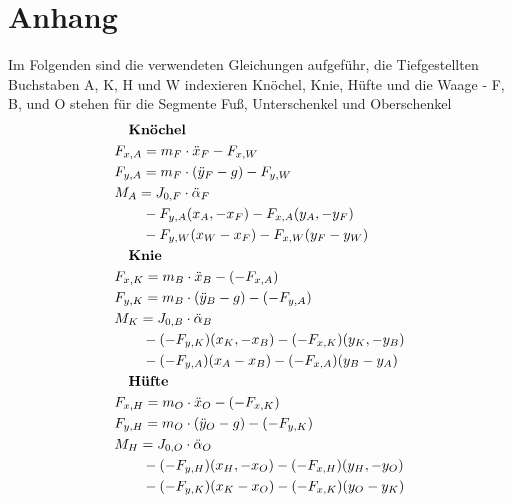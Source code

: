 \appendix                %

\setcounter{page}{1}
\section*{Anhang}%


Im Folgenden sind die verwendeten Gleichungen aufgeführ, die Tiefgestellten Buchstaben A, K, H und W indexieren Knöchel, Knie, Hüfte und die Waage -  F, B, und O stehen für die Segmente Fuß, Unterschenkel und Oberschenkel\\
\begin{align*}
& \quad \text{\textbf{Knöchel}}\\
& F_{x, A} =  m_F \cdot \ddot{x}_F - F_{x, W} \\
& F_{y, A} =  m_F \cdot (\ddot{y}_F - g) - F_{y, W} \\
& M_{A} =  J_{0, F} \cdot \ddot{\alpha}_F  \\
& \qquad - F_{y, A} (x_A, - x_F) - F_{x, A} (y_A, - y_F)\\
& \qquad - F_{y, W}(x_W - x_F) -  F_{x, W}(y_F - y_W)	\\
%		
&\quad \text{\textbf{Knie}}\\
& F_{x, K} =  m_B \cdot \ddot{x}_B - (-F_{x, A}) \\
& F_{y, K} =  m_B \cdot (\ddot{y}_B - g) - (-F_{y, A}) \\
& M_{K} =  J_{0, B} \cdot \ddot{\alpha}_B  \\
& \qquad - (-F_{y, K}) (x_K, - x_B) - (-F_{x, K}) (y_K, - y_B)\\
& \qquad- (-F_{y, A})(x_A - x_B) -  (-F_{x, A})(y_B - y_A)	\\
%		
& \quad \text{\textbf{Hüfte}}\\
& F_{x, H} =  m_O \cdot \ddot{x}_O - (-F_{x, K}) \\
& F_{y, H} =  m_O \cdot (\ddot{y}_O - g) - (-F_{y, K}) \\
& M_{H} =  J_{0, O} \cdot \ddot{\alpha}_O  \\
& \qquad - (-F_{y, H}) (x_H, - x_O) - (-F_{x, H}) (y_H, - y_O)\\
& \qquad- (-F_{y, K})(x_K - x_O) -  (-F_{x, K})(y_O - y_K)				
\end{align*}